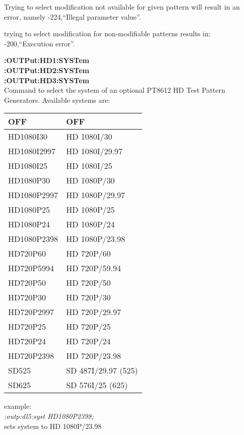 Trying to select modification not available for given pattern will result in an error, namely -224,``Illegal parameter value''.

trying to select modification for non-modifiable patterns results in: -200,``Execution error''.

\textbf{:OUTPut:HD1:SYSTem}\\
\textbf{:OUTPut:HD2:SYSTem}\\
\textbf{:OUTPut:HD3:SYSTem}\\
Command to select the system of an optional PT8612 HD Test Pattern Generators.  Available systems are:

\begin{tabular}{|l|l|}
\hline
OFF          &   OFF                  \\ \hline
HD1080I30    &   HD 1080I/30          \\ \hline
HD1080I2997  &   HD 1080I/29.97       \\ \hline
HD1080I25    &   HD 1080I/25          \\ \hline
HD1080P30    &   HD 1080P/30          \\ \hline
HD1080P2997  &   HD 1080P/29.97       \\ \hline
HD1080P25    &   HD 1080P/25          \\ \hline
HD1080P24    &   HD 1080P/24          \\ \hline
HD1080P2398  &   HD 1080P/23.98       \\ \hline
HD720P60     &   HD 720P/60           \\ \hline
HD720P5994   &   HD 720P/59.94        \\ \hline
HD720P50     &   HD 720P/50           \\ \hline
HD720P30     &   HD 720P/30           \\ \hline
HD720P2997   &   HD 720P/29.97        \\ \hline
HD720P25     &   HD 720P/25           \\ \hline
HD720P24     &   HD 720P/24           \\ \hline
HD720P2398   &   HD 720P/23.98        \\ \hline
SD525        &   SD 487I/29.97 (525)  \\ \hline
SD625        &   SD 576I/25 (625)     \\ \hline
\end{tabular}

example:\\
\textit{:outp:dl5:syst HD1080P2398;}\\
sets system to HD 1080P/23.98

